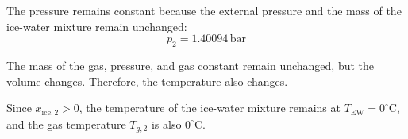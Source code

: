 The pressure remains constant because the external pressure and the mass of the ice-water mixture remain unchanged:  
\[
p_2 = 1.40094 \, \text{bar}
\]  

The mass of the gas, pressure, and gas constant remain unchanged, but the volume changes. Therefore, the temperature also changes.  

Since \( x_{\text{ice},2} > 0 \), the temperature of the ice-water mixture remains at \( T_{\text{EW}} = 0^\circ\text{C} \), and the gas temperature \( T_{g,2} \) is also \( 0^\circ\text{C} \).
